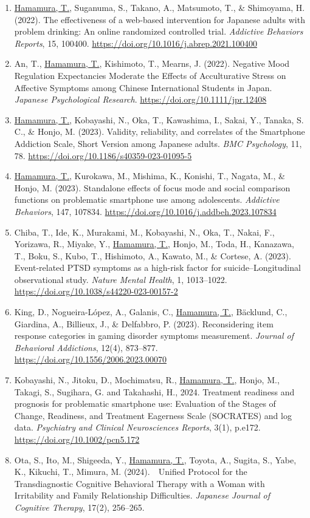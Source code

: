 \documentclass[a4paper]{article}
\begin{document}
\begin{enumerate}
	\item \underline{Hamamura, T.}, Suganuma, S., Takano, A., Matsumoto, T., \& Shimoyama, H. (2022). The effectiveness of a web-based intervention for Japanese adults with problem drinking: An online randomized controlled trial. \textit{Addictive Behaviors Reports}, 15, 100400. \url{https://doi.org/10.1016/j.abrep.2021.100400}
	\item An, T., \underline{Hamamura, T.}, Kishimoto, T., Mearns, J. (2022). Negative Mood Regulation Expectancies Moderate the Effects of Acculturative Stress on Affective Symptoms among Chinese International Students in Japan. \textit{Japanese Psychological Research}. \url{https://doi.org/10.1111/jpr.12408}
	\item \underline{Hamamura, T.}, Kobayashi, N., Oka, T., Kawashima, I., Sakai, Y., Tanaka, S. C., \& Honjo, M. (2023). Validity, reliability, and correlates of the Smartphone Addiction Scale, Short Version among Japanese adults. \textit{BMC Psychology}, 11, 78. \url{https://doi.org/10.1186/s40359-023-01095-5}
	\item \underline{Hamamura, T.}, Kurokawa, M., Mishima, K., Konishi, T., Nagata, M., \& Honjo, M. (2023). Standalone effects of focus mode and social comparison functions on problematic smartphone use among adolescents. \textit{Addictive Behaviors}, 147, 107834. \url{https://doi.org/10.1016/j.addbeh.2023.107834}
	\item Chiba, T., Ide, K., Murakami, M., Kobayashi, N., Oka, T., Nakai, F., Yorizawa, R., Miyake, Y., \underline{Hamamura, T.}, Honjo, M., Toda, H., Kanazawa, T., Boku, S., Kubo, T., Hishimoto, A., Kawato, M., \&  Cortese, A. (2023). Event-related PTSD symptoms as a high-risk factor for suicide--Longitudinal observational study. \textit{Nature Mental Health}, 1, 1013--1022. \url{https://doi.org/10.1038/s44220-023-00157-2}
	\item King, D., Nogueira-López, A., Galanis, C., \underline{Hamamura, T.}, Bäcklund, C., Giardina, A., Billieux, J., \& Delfabbro, P. (2023). Reconsidering item response categories in gaming disorder symptoms measurement. \textit{Journal of Behavioral Addictions}, 12(4), 873--877. \url{https://doi.org/10.1556/2006.2023.00070}
	\item Kobayashi, N., Jitoku, D., Mochimatsu, R., \underline{Hamamura, T.}, Honjo, M., Takagi, S., Sugihara, G. and Takahashi, H., 2024. Treatment readiness and prognosis for problematic smartphone use: Evaluation of the Stages of Change, Readiness, and Treatment Eagerness Scale (SOCRATES) and log data. \textit{Psychiatry and Clinical Neurosciences Reports}, 3(1), p.e172. \url{https://doi.org/10.1002/pcn5.172}
	\item Ota, S., Ito, M., Shigeeda, Y., \underline{Hamamura, T.}, Toyota, A., Sugita, S., Yabe, K., Kikuchi, T., Mimura, M. (2024).　Unified Protocol for the Transdiagnostic Cognitive Behavioral Therapy with a Woman with Irritability and Family Relationship Difficulties. \textit{Japanese Journal of Cognitive Therapy}, 17(2), 256--265.
\end{enumerate}
\end{document}

